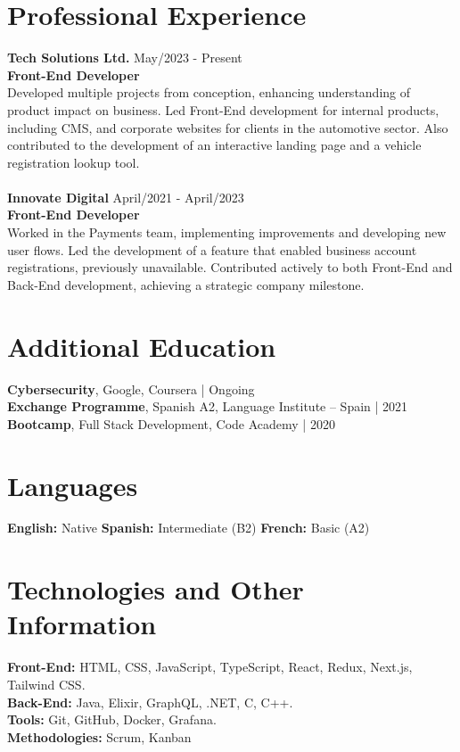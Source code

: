 \documentclass[a4paper,10pt]{article}
\begin{document}
\section*{Professional Experience}
\textbf{Tech Solutions Ltd.} \hfill May/2023 - Present  \\
\textbf{Front-End Developer}  \\
Developed multiple projects from conception, enhancing understanding of product impact on business. Led Front-End development for internal products, including CMS, and corporate websites for clients in the automotive sector. Also contributed to the development of an interactive landing page and a vehicle registration lookup tool. \\
\\
\textbf{Innovate Digital} \hfill April/2021 - April/2023  \\
\textbf{Front-End Developer}  \\
Worked in the Payments team, implementing improvements and developing new user flows. Led the development of a feature that enabled business account registrations, previously unavailable. Contributed actively to both Front-End and Back-End development, achieving a strategic company milestone.

\vspace{0.5em}

\section*{Additional Education}
\textbf{Cybersecurity}, Google, Coursera | Ongoing  \\
\textbf{Exchange Programme}, Spanish A2, Language Institute – Spain | 2021 \\
\textbf{Bootcamp}, Full Stack Development, Code Academy | 2020  

\section*{Languages}
\textbf{English:} Native \quad
\textbf{Spanish:} Intermediate (B2) \quad
\textbf{French:} Basic (A2)

\vspace{0.5em}

\section*{Technologies and Other Information}
\textbf{Front-End:} HTML, CSS, JavaScript, TypeScript, React, Redux, Next.js, Tailwind CSS.  \\
\textbf{Back-End:} Java, Elixir, GraphQL, .NET, C, C++.  \\
\textbf{Tools:} Git, GitHub, Docker, Grafana.  \\
\textbf{Methodologies:} Scrum, Kanban  
\end{document}
